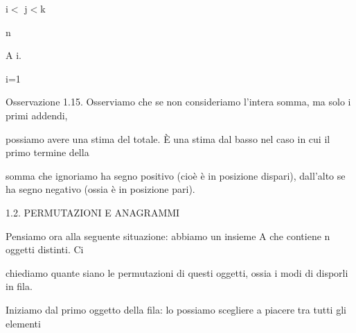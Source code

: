 \documentclass[a4paper,portrait,12pt]{article}
\begin{document}
\begin{flushleft}
i$<$ j$<$k
\end{flushleft}





\begin{flushleft}
n
\end{flushleft}





\begin{flushleft}
A i.
\end{flushleft}





\begin{flushleft}
i=1
\end{flushleft}





\begin{flushleft}
Osservazione 1.15. Osserviamo che se non consideriamo l'intera somma, ma solo i primi addendi,
\end{flushleft}


\begin{flushleft}
possiamo avere una stima del totale. \`{E} una stima dal basso nel caso in cui il primo termine della
\end{flushleft}


\begin{flushleft}
somma che ignoriamo ha segno positivo (cio\`{e} \`{e} in posizione dispari), dall'alto se ha segno negativo (ossia \`{e} in posizione pari).
\end{flushleft}





\begin{flushleft}
1.2. PERMUTAZIONI E ANAGRAMMI
\end{flushleft}


\begin{flushleft}
Pensiamo ora alla seguente situazione: abbiamo un insieme A che contiene n oggetti distinti. Ci
\end{flushleft}


\begin{flushleft}
chiediamo quante siano le permutazioni di questi oggetti, ossia i modi di disporli in fila.
\end{flushleft}


\begin{flushleft}
Iniziamo dal primo oggetto della fila: lo possiamo scegliere a piacere tra tutti gli elementi
\end{flushleft}
\end{document}
